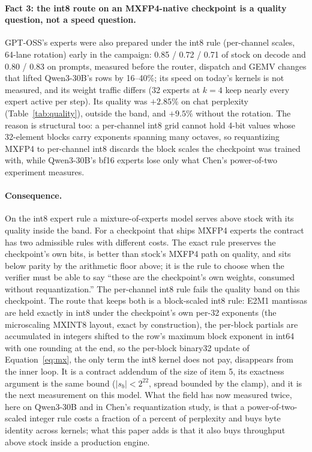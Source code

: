 \documentclass{article}
\begin{document}
\paragraph{Fact 3: the int8 route on an MXFP4-native checkpoint is a quality question, not a
speed question.}  GPT-OSS's experts were also prepared under the int8 rule (per-channel
scales, 64-lane rotation) early in the campaign: 0.85 / 0.72 / 0.71 of stock on decode and
0.80 / 0.83 on prompts, measured before the router, dispatch and GEMV changes that lifted
Qwen3-30B's rows by 16--40\%; its speed on today's kernels is not measured, and its weight
traffic differs (32 experts at $k=4$ keep nearly every expert active per step).  Its
quality was $+2.85\%$ on chat perplexity (Table~\ref{tab:quality}), outside the band, and
$+9.5\%$ without the rotation.  The reason is structural too: a per-channel int8 grid cannot
hold 4-bit values whose 32-element blocks carry exponents spanning many octaves, so
requantizing MXFP4 to per-channel int8 discards the block scales the checkpoint was trained
with, while Qwen3-30B's bf16 experts lose only what Chen's power-of-two experiment measures.

\paragraph{Consequence.}  On the int8 expert rule a mixture-of-experts model serves above
stock with its quality inside the band.  For a checkpoint that ships MXFP4 experts the
contract has two admissible rules with different costs.  The exact rule preserves the checkpoint's
own bits, is better than stock's MXFP4 path on quality, and sits below parity by the
arithmetic floor above; it is the rule to choose when the verifier must be able to say
``these are the checkpoint's own weights, consumed without requantization.''  The per-channel
int8 rule fails the quality band on this checkpoint.  The
route that keeps both is a block-scaled int8 rule: E2M1 mantissas are held exactly in int8
under the checkpoint's own per-32 exponents (the microscaling MXINT8 layout, exact by
construction), the per-block partials are accumulated in integers shifted to the row's
maximum block exponent in int64 with one rounding at the end, so the per-block binary32
update of Equation~\eqref{eq:mx}, the only term the int8 kernel does not pay, disappears
from the inner loop.  It is a contract addendum of the size of item 5, its exactness argument
is the same bound ($|s_b|<2^{22}$, spread bounded by the clamp), and it is the next
measurement on this model.  What the field has now measured twice, here on Qwen3-30B and in
Chen's requantization study, is that a power-of-two-scaled integer rule costs a fraction of a
percent of perplexity and buys byte identity across kernels; what this paper adds is that it
also buys throughput above stock inside a production engine.
\end{document}
